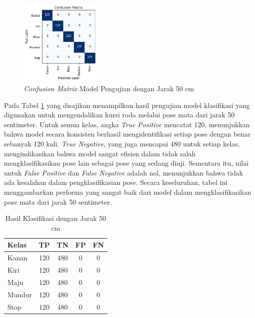 \begin{figure} [H] \centering
  \includegraphics[width=0.35\textwidth]{gambar/bab4/model6 (50cm)/matrix.png}
  \caption{\emph{Confusion Matrix} Model Pengujian dengan Jarak 50 cm}
  \label{fig:matrix3}
\end{figure}

Pada Tabel \ref{tb:cm_model3} yang disajikan menampilkan hasil pengujian model klasifikasi yang digunakan untuk mengendalikan kursi roda melalui pose mata dari jarak 50 sentimeter. Untuk semua kelas, angka \emph{True Positive} mencatat 120, menunjukkan bahwa model secara konsisten berhasil mengidentifikasi setiap pose dengan benar sebanyak 120 kali. \emph{True Negative}, yang juga mencapai 480 untuk setiap kelas, mengindikasikan bahwa model sangat efisien dalam tidak salah mengklasifikasikan pose lain sebagai pose yang sedang diuji. Sementara itu, nilai untuk \emph{False Positive} dan \emph{False Negative} adalah nol, menunjukkan bahwa tidak ada kesalahan dalam pengklasifikasian pose. Secara keseluruhan, tabel ini menggambarkan performa yang sangat baik dari model dalam mengklasifikasikan pose mata dari jarak 50 sentimeter.

\begin{longtable}{|l|c|c|c|c|}
  \caption{Hasil Klasifikasi dengan Jarak 50 cm}
  \label{tb:cm_model3} \\
  \hline
  \rowcolor[HTML]{C0C0C0} 
  \textbf{Kelas} & \textbf{TP} & \textbf{TN} & \textbf{FP} & \textbf{FN} \\ \hline
  Kanan    & 120          & 480         & 0           & 0           \\ \hline
  Kiri      & 120          & 480         & 0           & 0           \\ \hline
  Maju      & 120          & 480         & 0           & 0           \\ \hline
  Mundur     & 120          & 480         & 0           & 0           \\ \hline
  Stop  & 120          & 480         & 0           & 0           \\ \hline
\end{longtable}

